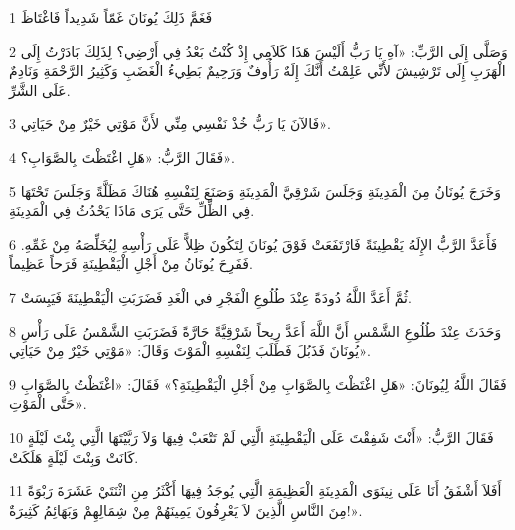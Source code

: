 \par 1 فَغَمَّ ذَلِكَ يُونَانَ غَمّاً شَدِيداً فَاغْتَاظَ
\par 2 وَصَلَّى إِلَى الرَّبِّ: «آهِ يَا رَبُّ أَلَيْسَ هَذَا كَلاَمِي إِذْ كُنْتُ بَعْدُ فِي أَرْضِي؟ لِذَلِكَ بَادَرْتُ إِلَى الْهَرَبِ إِلَى تَرْشِيشَ لأَنِّي عَلِمْتُ أَنَّكَ إِلَهٌ رَأُوفٌ وَرَحِيمٌ بَطِيءُ الْغَضَبِ وَكَثِيرُ الرَّحْمَةِ وَنَادِمٌ عَلَى الشَّرِّ.
\par 3 فَالآنَ يَا رَبُّ خُذْ نَفْسِي مِنِّي لأَنَّ مَوْتِي خَيْرٌ مِنْ حَيَاتِي».
\par 4 فَقَالَ الرَّبُّ: «هَلِ اغْتَظْتَ بِالصَّوَابِ؟».
\par 5 وَخَرَجَ يُونَانُ مِنَ الْمَدِينَةِ وَجَلَسَ شَرْقِيَّ الْمَدِينَةِ وَصَنَعَ لِنَفْسِهِ هُنَاكَ مَظَلَّةً وَجَلَسَ تَحْتَهَا فِي الظِّلِّ حَتَّى يَرَى مَاذَا يَحْدُثُ فِي الْمَدِينَةِ.
\par 6 فَأَعَدَّ الرَّبُّ الإِلَهُ يَقْطِينَةً فَارْتَفَعَتْ فَوْقَ يُونَانَ لِتَكُونَ ظِلاًّ عَلَى رَأْسِهِ لِيُخَلِّصَهُ مِنْ غَمِّهِ. فَفَرِحَ يُونَانُ مِنْ أَجْلِ الْيَقْطِينَةِ فَرَحاً عَظِيماً.
\par 7 ثُمَّ أَعَدَّ اللَّهُ دُودَةً عِنْدَ طُلُوعِ الْفَجْرِ في الْغَدِ فَضَرَبَتِ الْيَقْطِينَةَ فَيَبِسَتْ.
\par 8 وَحَدَثَ عِنْدَ طُلُوعِ الشَّمْسِ أَنَّ اللَّهَ أَعَدَّ رِيحاً شَرْقِيَّةً حَارَّةً فَضَرَبَتِ الشَّمْسُ عَلَى رَأْسِ يُونَانَ فَذَبُلَ فَطَلَبَ لِنَفْسِهِ الْمَوْتَ وَقَالَ: «مَوْتِي خَيْرٌ مِنْ حَيَاتِي».
\par 9 فَقَالَ اللَّهُ لِيُونَانَ: «هَلِ اغْتَظْتَ بِالصَّوَابِ مِنْ أَجْلِ الْيَقْطِينَةِ؟» فَقَالَ: «اغْتَظْتُ بِالصَّوَابِ حَتَّى الْمَوْتِ».
\par 10 فَقَالَ الرَّبُّ: «أَنْتَ شَفِقْتَ عَلَى الْيَقْطِينَةِ الَّتِي لَمْ تَتْعَبْ فِيهَا وَلاَ رَبَّيْتَهَا الَّتِي بِنْتَ لَيْلَةٍ كَانَتْ وَبِنْتَ لَيْلَةٍ هَلَكَتْ.
\par 11 أَفَلاَ أَشْفَقُ أَنَا عَلَى نِينَوَى الْمَدِينَةِ الْعَظِيمَةِ الَّتِي يُوجَدُ فِيهَا أَكْثَرُ مِنِ اثْنَتَيْ عَشَرَةَ رَبْوَةً مِنَ النَّاسِ الَّذِينَ لاَ يَعْرِفُونَ يَمِينَهُمْ مِنْ شِمَالِهِمْ وَبَهَائِمُ كَثِيرَةٌ!».

